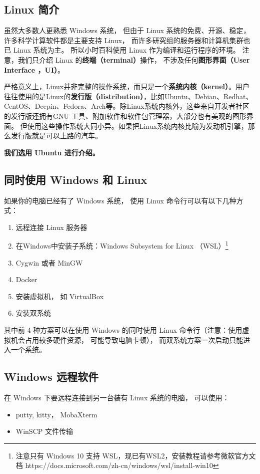 
\begin{issues}
\issueTODO
\end{issues}

\subsection{Linux 简介}
虽然大多数人更熟悉 Windows 系统， 但由于 Linux 系统的免费、开源、稳定， 许多科学计算软件都是主要支持 Linux， 而许多研究组的服务器和计算机集群也已 Linux 系统为主。 所以小时百科使用 Linux 作为编译和运行程序的环境。 注意，我们只介绍 Linux 的\textbf{终端（terminal）}操作， 不涉及任何\textbf{图形界面（User Interface ，UI）}。 

严格意义上，Linux并非完整的操作系统，而只是一个\textbf{系统内核（kernel）}。用户往往使用的是Linux的\textbf{发行版（distribution）}，比如Ubuntu、Debian、Redhat、CentOS、Deepin、Fedora、Arch等。除Linux系统内核外，这些来自开发者社区的发行版还拥有GNU 工具、附加软件和软件包管理器，大部分也有美观的图形界面。 但使用这些操作系统大同小异。如果把Linux系统内核比喻为发动机引擎，那么发行版就是可以上路的汽车。

\textbf{我们选用 Ubuntu 进行介绍。}


\subsection{同时使用 Windows 和 Linux}
如果你的电脑已经有了 Windows 系统， 使用 Linux 命令行可以有以下几种方式：
\begin{enumerate}
\item 远程连接 Linux 服务器
\item 在Windows中安装子系统：Windows Subsystem for Linux （WSL）\footnote{注意只有 Windows 10 支持 WSL，现已有WSL2，安装教程请参考微软官方文档 https://docs.microsoft.com/zh-cn/windows/wsl/install-win10} 
\item Cygwin 或者 MinGW
\item Docker
\item 安装虚拟机， 如 VirtualBox
\item 安装双系统
\end{enumerate}
其中前 4 种方案可以在使用 Windows 的同时使用 Linux 命令行（注意：使用虚拟机会占用较多硬件资源， 可能导致电脑卡顿）， 而双系统方案一次启动只能进入一个系统。

\subsection{Windows 远程软件}
在 Windows 下要远程连接到另一台装有 Linux 系统的电脑， 可以使用：
\begin{itemize}
\item putty, kitty， MobaXterm
\item WinSCP 文件传输
\end{itemize}


